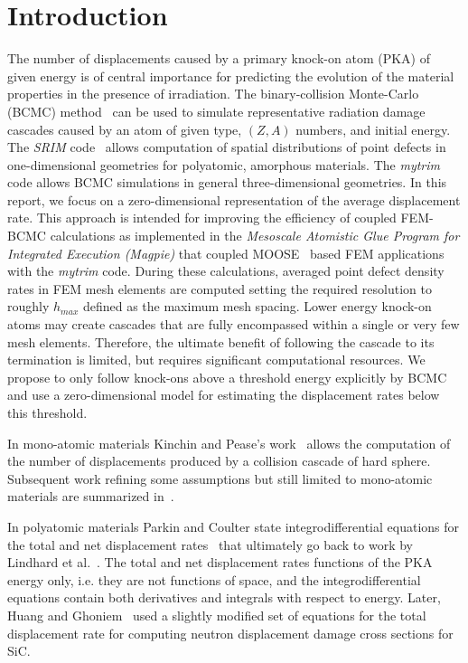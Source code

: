 \documentclass[review]{elsarticle}
\begin{document}
\section{Introduction}
The number of displacements caused by a primary knock-on atom (PKA) of given energy is of central importance for predicting the evolution of the material properties in the presence of irradiation. 
The binary-collision Monte-Carlo (BCMC) method~\cite{SRIM} can be used to simulate representative radiation damage cascades caused by an atom of given type, $(Z, A)$ numbers, and initial energy. The \textit{SRIM} code~\cite{SRIM} allows computation of spatial distributions of point defects in one-dimensional geometries for polyatomic, amorphous materials. The \textit{mytrim}~\cite{Schwen2010} code allows BCMC simulations in general three-dimensional geometries.  
In this report, we focus on a zero-dimensional representation of the average displacement rate. This approach is intended for improving the 
efficiency of coupled FEM-BCMC calculations as implemented in the \textit{Mesoscale Atomistic Glue Program for Integrated Execution (Magpie)} that coupled MOOSE~\cite{Derek2015} based FEM applications with the \textit{mytrim} code. During these calculations, averaged point defect density rates in FEM mesh elements are computed setting the required resolution to roughly $h_{max}$ defined as the maximum mesh spacing. Lower energy knock-on atoms may create cascades that are fully encompassed within a single or very few mesh elements. Therefore, the ultimate benefit of following the cascade to its termination is limited, but requires significant computational resources. We propose to only follow knock-ons above a threshold energy explicitly by BCMC and use a zero-dimensional model for estimating the displacement rates below this threshold. 

In mono-atomic materials Kinchin and Pease's work~\cite{Kinchin1955} allows the computation of the number of displacements  
produced by a collision cascade of hard sphere. Subsequent work refining some assumptions but still limited to mono-atomic materials are
summarized in~\cite{GaryWas}.

In polyatomic materials Parkin and Coulter state integrodifferential equations for the total and net displacement rates~\cite{PC1981} that ultimately go back to work by Lindhard et al.~\cite{Lindhard1963}. The total and net displacement rates functions of the PKA energy only, i.e. they are not functions of space, and the integrodifferential equations contain both derivatives and integrals with respect to energy. Later, Huang and Ghoniem~\cite{Huang1993} used a slightly modified set of equations for the total displacement rate for computing neutron displacement damage cross sections for SiC.
\end{document}
